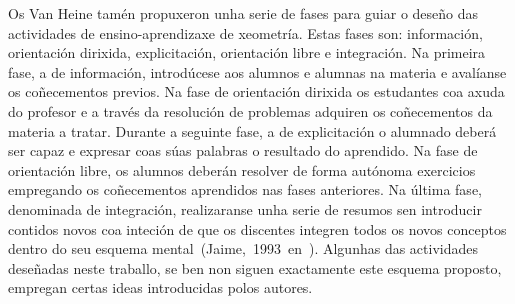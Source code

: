 Os Van Heine tamén propuxeron unha serie de fases para guiar o deseño das actividades de ensino-aprendizaxe de xeometría. Estas fases son: información, orientación dirixida, explicitación, orientación libre e integración. Na primeira fase, a de información, introdúcese aos alumnos e alumnas na materia e avalíanse os coñecementos previos. Na fase de orientación dirixida os estudantes coa axuda do profesor e a través da resolución de problemas adquiren os coñecementos da materia a tratar. Durante a seguinte fase, a de explicitación o alumnado deberá ser capaz e expresar coas súas palabras o resultado do aprendido. Na fase de orientación libre, os alumnos deberán resolver de forma autónoma exercicios empregando os coñecementos aprendidos nas fases anteriores. Na última fase, denominada de integración, realizaranse unha serie de resumos sen introducir contidos novos coa inteción de que os discentes integren todos os novos conceptos dentro do seu esquema mental~(Jaime,~1993~en~). Algunhas das actividades deseñadas neste traballo, se ben non siguen exactamente este esquema proposto, empregan certas ideas introducidas polos autores.
